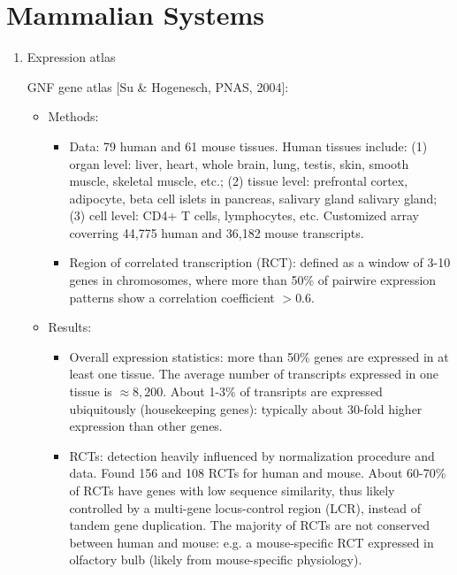 \documentclass{report}
\begin{document}
\section{Mammalian Systems}
\begin{enumerate}
	
	\item{Expression atlas}
	
	GNF gene atlas [Su \& Hogenesch, PNAS, 2004]:
	\begin{itemize}
		\item Methods: 
		\begin{itemize}
			\item Data: 79 human and 61 mouse tissues. Human tissues include: (1) organ level: liver, heart, whole brain, lung, testis, skin, smooth muscle, skeletal muscle, etc.; (2) tissue level: prefrontal cortex, adipocyte, beta cell islets in pancreas, salivary gland salivary gland; (3) cell level: CD4+ T cells, lymphocytes, etc. Customized array coverring 44,775 human and 36,182 mouse transcripts. 
			\item Region of correlated transcription (RCT): defined as a window of 3-10 genes in chromosomes, where more than 50\% of pairwire expression patterns show a correlation coefficient $> 0.6$. 
		\end{itemize}
		
		\item Results: 
		\begin{itemize}
			\item Overall expression statistics: more than 50\% genes are expressed in at least one tissue. The average number of transcripts expressed in one tissue is $\approx 8,200$. About 1-3\% of transripts are expressed ubiquitously (housekeeping genes): typically about 30-fold higher expression than other genes. 
			\item RCTs: detection heavily influenced by normalization procedure and data. Found 156 and 108 RCTs for human and mouse. About 60-70\% of RCTs have genes with low sequence similarity, thus likely controlled by a multi-gene locus-control region (LCR), instead of tandem gene duplication. The majority of RCTs are not conserved between human and mouse: e.g. a mouse-specific RCT expressed in olfactory bulb (likely from mouse-specific physiology). 
		\end{itemize}
	\end{itemize}
	

\end{enumerate}
\end{document}
